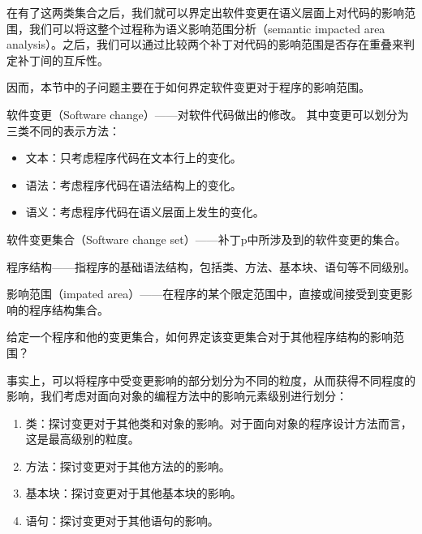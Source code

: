 在有了这两类集合之后，我们就可以界定出软件变更在语义层面上对代码的影响范围，我们可以将这整个过程称为语义影响范围分析（semantic impacted area analysis）。之后，我们可以通过比较两个补丁对代码的影响范围是否存在重叠来判定补丁间的互斥性。

因而，本节中的子问题主要在于如何界定软件变更对于程序的影响范围。


\begin{definition}
	软件变更（Software change）——对软件代码做出的修改。
	其中变更可以划分为三类不同的表示方法：
		\begin{itemize}
			\item 文本：只考虑程序代码在文本行上的变化。
			\item 语法：考虑程序代码在语法结构上的变化。
			\item 语义：考虑程序代码在语义层面上发生的变化。
		\end{itemize}
\end{definition}

\begin{definition}
	软件变更集合（Software change set）——补丁p中所涉及到的软件变更的集合。
\end{definition}

\begin{definition}
	程序结构——指程序的基础语法结构，包括类、方法、基本块、语句等不同级别。
\end{definition}

\begin{definition}
	影响范围（impated area）——在程序的某个限定范围中，直接或间接受到变更影响的程序结构集合。
\end{definition}

\begin{problem}
	\label {impacted_area}
	给定一个程序和他的变更集合，如何界定该变更集合对于其他程序结构的影响范围？
\end{problem}

事实上，可以将程序中受变更影响的部分划分为不同的粒度，从而获得不同程度的影响，我们考虑对面向对象的编程方法中的影响元素级别进行划分：

\begin{enumerate}
	\item 类：探讨变更对于其他类和对象的影响。对于面向对象的程序设计方法而言，这是最高级别的粒度。
	\item 方法：探讨变更对于其他方法的的影响。
	\item 基本块：探讨变更对于其他基本块的影响。
	\item 语句：探讨变更对于其他语句的影响。
\end{enumerate}

